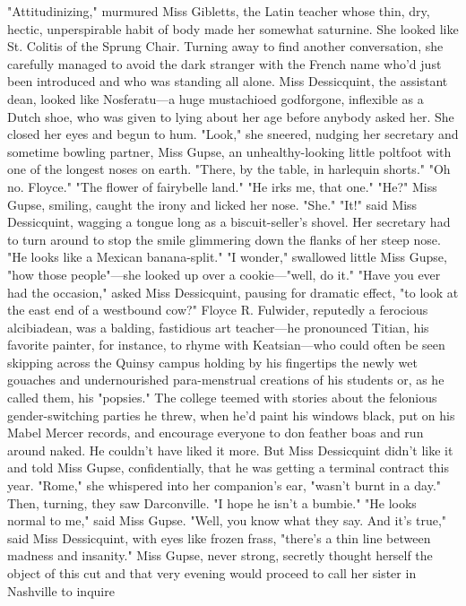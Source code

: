   "Attitudinizing," murmured Miss Gibletts, the Latin teacher whose thin, dry,
hectic, unperspirable habit of body made her somewhat saturnine. She looked like
St. Colitis of the Sprung Chair. Turning away to find another conversation, she
carefully managed to avoid the dark stranger with the French name who'd just
been introduced and who was standing all alone.
  Miss Dessicquint, the assistant dean, looked like Nosferatu---a huge mustachioed
godforgone, inflexible as a Dutch shoe, who was given to lying about her age
before anybody asked her. She closed her eyes and begun to hum. "Look," she
sneered, nudging her secretary and sometime bowling partner, Miss Gupse, an
unhealthy-looking little poltfoot with one of the longest noses on earth.
"There, by the table, in harlequin shorts."
  "Oh no. Floyce."
  "The flower of fairybelle land."
  "He irks me, that one."
  "He?"
  Miss Gupse, smiling, caught the irony and licked her nose. "She."
  "It!" said Miss Dessicquint, wagging a tongue long as a biscuit-seller's
shovel. Her secretary had to turn around to stop the smile glimmering down the
flanks of her steep nose. "He looks like a Mexican banana-split."
  "I wonder," swallowed little Miss Gupse, "how those people"---she looked up over
a cookie---"well, do it."
  "Have you ever had the occasion," asked Miss Dessicquint, pausing for dramatic
effect, "to look at the east end of a westbound cow?"
  Floyce R. Fulwider, reputedly a ferocious alcibiadean, was a balding,
fastidious art teacher---he pronounced Titian, his favorite painter, for instance,
to rhyme with Keatsian---who could often be seen skipping across the Quinsy campus
holding by his fingertips the newly wet gouaches and undernourished
para-menstrual creations of his students or, as he called them, his "popsies."
The college teemed with stories about the felonious gender-switching parties he
threw, when he'd paint his windows black, put on his Mabel Mercer records, and
encourage everyone to don feather boas and run around naked. He couldn't have
liked it more. But Miss Dessicquint didn't like it and told Miss Gupse,
confidentially, that he was getting a terminal contract this year. "Rome," she
whispered into her companion's ear, "wasn't burnt in a day."
  Then, turning, they saw Darconville.
  "I hope he isn't a bumbie."
  "He looks normal to me," said Miss Gupse.
  "Well, you know what they say. And it's true," said Miss Dessicquint, with
eyes like frozen frass, "there's a thin line between madness and insanity."
  Miss Gupse, never strong, secretly thought herself the object of this cut and
that very evening would proceed to call her sister in Nashville to inquire
